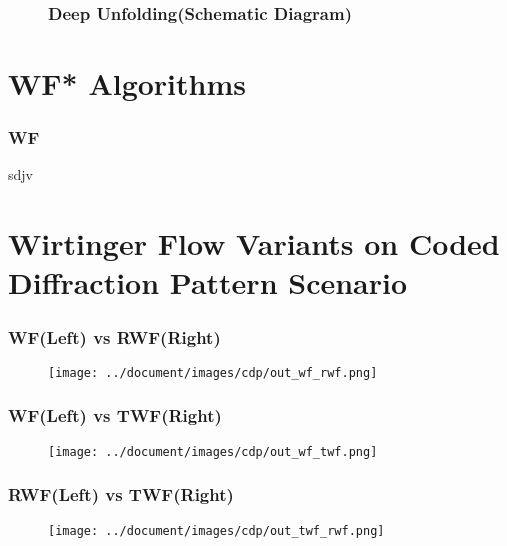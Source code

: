 \documentclass{beamer}
\theoremstyle{definition}
\theoremstyle{remark}
\begin{document}
\begin{frame}
  \begin{figure}
    \frametitle{Deep Unfolding(Schematic Diagram)}
    \centering
    \resizebox{1.0\textwidth}{!}{}
    \label{fig:deep_unfolding}
  \end{figure}
\end{frame}

\section[WF* Algorithms]{WF* Algorithms}
\begin{frame}
  \frametitle{WF}
sdjv

\end{frame}




\section[WF* Using CDPs]{Wirtinger Flow Variants on Coded Diffraction Pattern Scenario}



\begin{frame}
\frametitle{WF(Left) vs RWF(Right)}
  \begin{figure}[!htbp]
    \centering
    \texttt{[image: ../document/images/cdp/out\_wf\_rwf.png]}
  \label{image:wf_vs_rwf}
  \end{figure}
\end{frame}

\begin{frame}
   \frametitle{WF(Left) vs TWF(Right)}
     \begin{figure}[!htbp]
       \centering
       \texttt{[image: ../document/images/cdp/out\_wf\_twf.png]}
     \label{images:wf_vs_twf_cdp}
     \end{figure}
   \end{frame}
\begin{frame}
\frametitle{RWF(Left) vs TWF(Right)}
  \begin{figure}[!htbp]
    \centering
    \texttt{[image: ../document/images/cdp/out\_twf\_rwf.png]}
  \label{image:twf_vs_rwf_cdp}
  \end{figure}
\end{frame}
\end{document}
